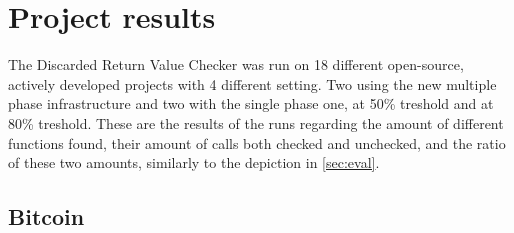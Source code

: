 
\chapter{Project results}
\label{appx:diagrams}

The Discarded Return Value Checker was run on 18 different open-source, actively developed projects with 4 different setting.
Two using the new multiple phase infrastructure and two with the single phase one, at 50\% treshold and at 80\% treshold.
These are the results of the runs regarding the amount of different functions found, their amount of calls both checked
and unchecked, and the ratio of these two amounts, similarly to the depiction in \cref{sec:eval}.
\pagebreak

\section*{Bitcoin}

\begin{figure}[H]
\end{figure}

\begin{figure}[H]
\end{figure}

